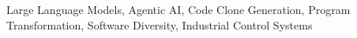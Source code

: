 \begin{abstract}
\end{abstract}

\begin{IEEEkeywords}
Large Language Models, Agentic AI, Code Clone Generation, Program Transformation, Software Diversity, Industrial Control Systems
\end{IEEEkeywords}
